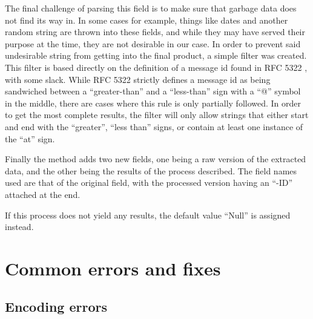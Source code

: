 \documentclass[a4paper,english]{report}
\begin{document}
\begin{center}



\end{center}


The final challenge of parsing this field is to make sure that garbage data does not find its way in.
In some cases for example, things like dates and another random string are thrown into these fields, and while they may have served their purpose at the time, they are not desirable in our case. 
In order to prevent said undesirable string from getting into the final product, a simple filter was created. This filter is based directly on the definition of a message id found in RFC 5322 \cite{RFC5322}, with some slack.
While RFC 5322 \cite{RFC5322} strictly defines a message id as being sandwiched between a “greater-than” and a “less-than”  sign with a “@” symbol in the middle, there are cases where this rule is only partially followed. In order to get the most complete results, the filter will only allow strings that either start and end with the “greater”, “less than” signs, or contain at least one instance of the “at” sign.  

\begin{center}



\end{center}

Finally the method adds two new fields, one being a raw version of the extracted data, and the other being the results of the process described. The field names used are that of the original field, with the processed version having an “-ID” attached at the end. 


\begin{center}



\end{center}

If this process does not yield any results, the default value “Null” is assigned instead. 


\section{Common errors and fixes}

\subsection{Encoding errors}
\end{document}
